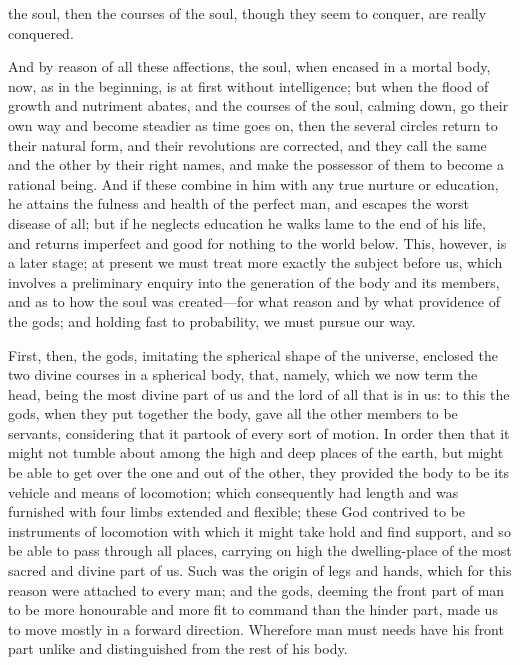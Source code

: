 \documentclass[11pt,letter]{article}
\begin{document}
the soul, then the courses of the soul, though they seem to conquer, are really conquered.

\par  And by reason of all these affections, the soul, when encased in a mortal body, now, as in the beginning, is at first without intelligence; but when the flood of growth and nutriment abates, and the courses of the soul, calming down, go their own way and become steadier as time goes on, then the several circles return to their natural form, and their revolutions are corrected, and they call the same and the other by their right names, and make the possessor of them to become a rational being. And if these combine in him with any true nurture or education, he attains the fulness and health of the perfect man, and escapes the worst disease of all; but if he neglects education he walks lame to the end of his life, and returns imperfect and good for nothing to the world below. This, however, is a later stage; at present we must treat more exactly the subject before us, which involves a preliminary enquiry into the generation of the body and its members, and as to how the soul was created—for what reason and by what providence of the gods; and holding fast to probability, we must pursue our way.

\par  First, then, the gods, imitating the spherical shape of the universe, enclosed the two divine courses in a spherical body, that, namely, which we now term the head, being the most divine part of us and the lord of all that is in us: to this the gods, when they put together the body, gave all the other members to be servants, considering that it partook of every sort of motion. In order then that it might not tumble about among the high and deep places of the earth, but might be able to get over the one and out of the other, they provided the body to be its vehicle and means of locomotion; which consequently had length and was furnished with four limbs extended and flexible; these God contrived to be instruments of locomotion with which it might take hold and find support, and so be able to pass through all places, carrying on high the dwelling-place of the most sacred and divine part of us. Such was the origin of legs and hands, which for this reason were attached to every man; and the gods, deeming the front part of man to be more honourable and more fit to command than the hinder part, made us to move mostly in a forward direction. Wherefore man must needs have his front part unlike and distinguished from the rest of his body.
\end{document}
